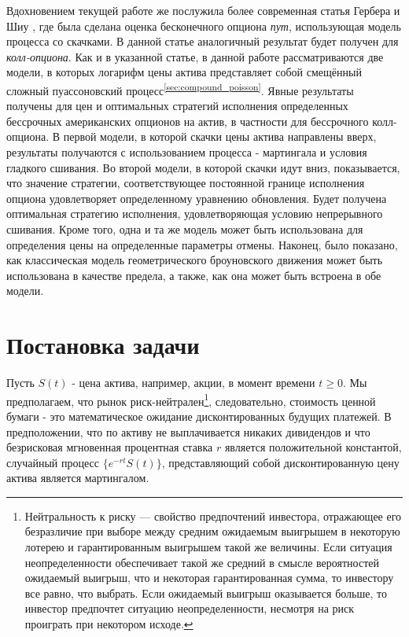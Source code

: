 \documentclass[a4paper,12pt]{article}
\theoremstyle{definition}
\begin{document}
Вдохновением текущей работе же послужила более современная статья Гербера и Шиу \cite{bib:GerberShiu}, где была сделана оценка бесконечного опциона \textit{пут}, использующая модель процесса со скачками. В данной статье аналогичный результат будет получен для \textit{колл-опциона}. Как и в указанной статье, в данной работе рассматриваются две модели, в которых логарифм цены актива представляет собой смещённый сложный пуассоновский процесс\textsuperscript{\ref{sec:compound_poisson}}. Явные результаты получены для цен и оптимальных стратегий исполнения определенных бессрочных американских опционов на актив, в частности для бессрочного колл-опциона. В первой модели, в которой скачки цены актива направлены вверх, результаты получаются с использованием процесса - мартингала и условия гладкого сшивания. Во второй модели, в которой скачки идут вниз, показывается, что значение стратегии, соответствующее постоянной границе исполнения опциона удовлетворяет определенному уравнению обновления. Будет получена оптимальная стратегию исполнения, удовлетворяющая условию непрерывного сшивания. Кроме того, одна и та же модель может быть использована для определения цены на определенные параметры отмены. Наконец, было показано, как классическая модель геометрического броуновского движения может быть использована в качестве предела, а также, как она может быть встроена в обе модели.


\section{Постановка задачи}

Пусть $S(t)$ - цена актива, например, акции, в момент времени $t \ge 0$. Мы предполагаем, что рынок риск-нейтрален\footnote{Нейтральность к риску — свойство предпочтений инвестора, отражающее его безразличие при выборе между средним ожидаемым выигрышем в некоторую лотерею и гарантированным выигрышем такой же величины. Если ситуация неопределенности обеспечивает такой же средний в смысле вероятностей ожидаемый выигрыш, что и некоторая гарантированная сумма, то инвестору все равно, что выбрать. Если ожидаемый выигрыш оказывается больше, то инвестор предпочтет ситуацию неопределенности, несмотря на риск проиграть при некотором исходе.}, следовательно, стоимость ценной бумаги - это математическое ожидание дисконтированных будущих платежей. В предположении, что по активу не выплачивается никаких дивидендов и что безрисковая мгновенная процентная ставка $r$ является положительной константой, случайный процесс $\{e^{-rt} S(t)\}$, представляющий собой дисконтированную цену актива  является мартингалом.
\end{document}
